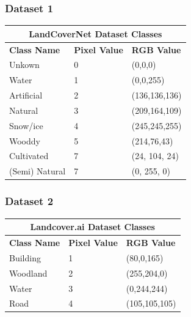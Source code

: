\documentclass[conference]{IEEEtran}
\begin{document}
\subsubsection{Dataset 1}

\begin{table}[htbp!]
\centering
\begin{tabular}{|p{1.8cm}|p{0.6cm}|p{1.6cm}|}
 \hline
 \multicolumn{3}{|c|}{\textbf{LandCoverNet Dataset Classes}} \\
 \hline
 \textbf{Class Name} & \textbf{Pixel Value}& \textbf{RGB Value} \\
 \hline
 Unkown & 0  & (0,0,0)\\ 
 \hline
 Water & 1  & (0,0,255)\\ 
 \hline
 Artificial & 2  & (136,136,136)\\ 
 \hline
 Natural & 3  & (209,164,109)\\ 
 \hline
 Snow/ice & 4 &  (245,245,255)\\ 
 \hline
 Wooddy & 5  & (214,76,43)\\ 
 \hline
 Cultivated & 7  & (24, 104, 24)\\ 
 \hline
 (Semi) Natural & 7  & (0, 255, 0)\\ 
 \hline
\end{tabular}
\label{landcover_ai_classes}
\end{table}

\subsubsection{Dataset 2}


\begin{table}[htbp]
\centering
\begin{tabular}{|p{1.2cm}|p{0.7cm}|p{1.6cm}|}
 \hline
 \multicolumn{3}{|c|}{\textbf{Landcover.ai Dataset Classes}} \\
 \hline
 \textbf{Class Name} & \textbf{Pixel Value}& \textbf{RGB Value} \\
 \hline
 Building & 1  & (80,0,165)\\ 
 \hline
 Woodland & 2  & (255,204,0)\\ 
 \hline
 Water & 3  & (0,244,244)\\ 
 \hline
 Road & 4  & (105,105,105)\\ 
 \hline
\end{tabular}
\label{landcover_ai_classes}
\end{table}
\end{document}
